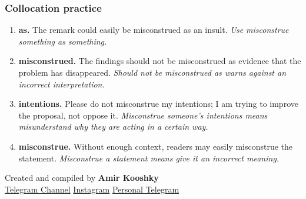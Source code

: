 \documentclass[11pt]{article}
\begin{document}
\subsubsection{Collocation practice}
\begin{enumerate}
  \item \textbf{as.} The remark could easily be misconstrued as an insult. \emph{Use misconstrue something as something.}
  \item \textbf{misconstrued.} The findings should not be misconstrued as evidence that the problem has disappeared. \emph{Should not be misconstrued as warns against an incorrect interpretation.}
  \item \textbf{intentions.} Please do not misconstrue my intentions; I am trying to improve the proposal, not oppose it. \emph{Misconstrue someone's intentions means misunderstand why they are acting in a certain way.}
  \item \textbf{misconstrue.} Without enough context, readers may easily misconstrue the statement. \emph{Misconstrue a statement means give it an incorrect meaning.}
\end{enumerate}

\vfill
\begin{center}
\small\color{Muted} Created and compiled by \textbf{Amir Kooshky}\\
\href{https://t.me/KooshkyTOEFL}{Telegram Channel}\quad\textbullet\quad
\href{https://www.instagram.com/kooshkytoefl}{Instagram}\quad\textbullet\quad
\href{https://t.me/KooshkyTOEFL\_pv}{Personal Telegram}
\end{center}
\end{document}
